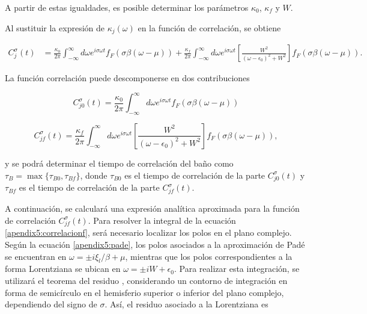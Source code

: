 \begin{appendixs}
A partir de estas igualdades, es posible determinar los parámetros $\kappa_{0}$, $\kappa_{f}$ y $W$. 

Al sustituir la expresión de $\kappa_{j}(\omega)$ en la función de correlación, se obtiene

\begin{align*}
    C^{\sigma}_{j}(t) & = \frac{\kappa_{0}}{2\pi} \int_{-\infty}^{\infty}d\omega e^{i\sigma \omega t} f_{F}(\sigma \beta (\omega-\mu)) + \frac{\kappa_{f}}{2\pi} \int_{-\infty}^{\infty}d\omega e^{i\sigma \omega t}\left[ \frac{W^{2}}{(\omega-\epsilon_{0})^{2} + W^{2}} \right] f_{F}(\sigma \beta (\omega-\mu)).
\end{align*}

La función correlación puede descomponerse en dos contribuciones

\begin{equation}
    C^{\sigma}_{j0}(t) = \frac{\kappa_{0}}{2\pi} \int_{-\infty}^{\infty}d\omega e^{i\sigma \omega t} f_{F}(\sigma \beta (\omega-\mu))
    \label{apendix5:correlacion0}
\end{equation}

\begin{equation}
    C^{\sigma}_{jf}(t) = \frac{\kappa_{f}}{2\pi} \int_{-\infty}^{\infty}d\omega e^{i\sigma \omega t}\left[ \frac{W^{2}}{(\omega-\epsilon_{0})^{2} + W^{2}} \right] f_{F}(\sigma \beta (\omega-\mu)),
    \label{apendix5:correlacionf}
\end{equation}

y se podrá determinar el tiempo de correlación del baño como $\tau_{B} = \max\{\tau_{B0}, \tau_{Bf}\}$, donde $\tau_{B0}$ es el tiempo de correlación de la parte $C^{\sigma}_{j0}(t)$ y $\tau_{Bf}$ es el tiempo de correlación de la parte $C^{\sigma}_{jf}(t)$. 

A continuación, se calculará una expresión analítica aproximada para la función de correlación $C^{\sigma}_{jf}(t)$. Para resolver la integral de la ecuación \eqref{apendix5:correlacionf}, será necesario localizar los polos en el plano complejo. Según la ecuación \eqref{apendix5:pade}, los polos asociados a la aproximación de Padé se encuentran en $\omega = \pm i \xi_{l}/\beta + \mu$, mientras que los polos correspondientes a la forma Lorentziana se ubican en $\omega = \pm i W + \epsilon_{0}$. Para realizar esta integración, se utilizará el teorema del residuo \cite{riley2006mathematical}, considerando un contorno de integración en forma de semicírculo en el hemisferio superior o inferior del plano complejo, dependiendo del signo de $\sigma$. Así, el residuo asociado a la Lorentziana es


\end{appendixs}
